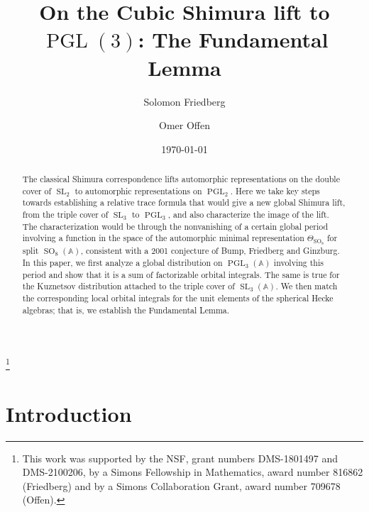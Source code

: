 \documentclass[12pt]{amsart}
\newcommand{\PGL}{\operatorname{PGL}}
\newcommand{\SL}{\operatorname{SL}}
\newcommand{\SO}{\operatorname{SO}}
\newcommand{\A}{\mathbb{A}}
\theoremstyle{remark}
\begin{document}
\title{On the Cubic Shimura lift to $\PGL(3)$:  The Fundamental Lemma}

\author{Solomon Friedberg}
\address{Department of Mathematics, Boston College, Chestnut Hill, MA 02467}

\author{Omer Offen}
\address{Department of Mathematics, Brandeis University, Waltham MA 02453}

\thanks{This work was supported by the NSF, grant numbers DMS-1801497 and DMS-2100206, by a Simons Fellowship in Mathematics, award number 816862 (Friedberg) and by a Simons Collaboration Grant, award number 709678 (Offen).}

\date{\today}

\begin{abstract} The classical Shimura correspondence lifts automorphic representations on the double cover of $\SL_2$ to 
automorphic representations on $\PGL_2$.   Here we take key steps towards establishing a relative trace formula
that would give a new global Shimura lift, from the triple cover of $\SL_3$ to $\PGL_3$, and also
 characterize the image of the lift.  The characterization would be through the nonvanishing of a certain global
 period involving a function in the space of the automorphic minimal representation $\Theta_{\SO_8}$ for split $\SO_8(\A)$,
 consistent with a 2001 conjecture of Bump, Friedberg and Ginzburg.
 In this paper, we first 
analyze a global distribution on $\PGL_3(\A)$ involving this period and show that it is a sum of factorizable orbital integrals.
The same is true for the Kuznetsov distribution attached to the triple cover of $\SL_3(\A)$.
We then match the corresponding local orbital integrals for the unit
 elements of the spherical Hecke algebras; that is, we establish the Fundamental Lemma.  

\end{abstract}

\maketitle

\goodbreak 

\tableofcontents

\goodbreak


\section{Introduction} \label{intro}
\end{document}
